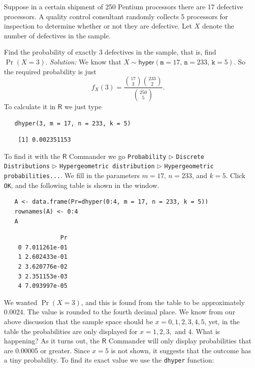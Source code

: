 \documentclass[captions=tableheading]{scrbook}
\begin{document}
\begin{example}
Suppose in a certain shipment of 250 Pentium processors there are 17 defective processors. A quality control consultant randomly collects 5 processors for inspection to determine whether or not they are defective. Let \(X\) denote the number of defectives in the sample.

Find the probability of exactly 3 defectives in the sample, that is, find \(\Pr(X=3)\). 
   \emph{Solution:} We know that \(X\sim\mathsf{hyper}(\mathtt{m}=17,\,\mathtt{n}=233,\,\mathtt{k}=5)\). So the required probability is just
   \[
   f_{X}(3)=\frac{{17 \choose 3}{233 \choose 2}}{{250 \choose 5}}.
   \]
   To calculate it in \(\mathsf{R}\) we just type 


\begin{verbatim}
   dhyper(3, m = 17, n = 233, k = 5)
\end{verbatim}

\begin{verbatim}
    [1] 0.002351153
\end{verbatim}

   To find it with the \(\mathsf{R}\) Commander we go \texttt{Probability} \(\triangleright\) \texttt{Discrete Distributions} \(\triangleright\) \texttt{Hypergeometric distribution} \(\triangleright\) \texttt{Hypergeometric probabilities...}. We fill in the parameters \(m=17\), \(n=233\), and \(k=5\). Click \texttt{OK}, and the following table is shown in the window.


\begin{verbatim}
   A <- data.frame(Pr=dhyper(0:4, m = 17, n = 233, k = 5))
   rownames(A) <- 0:4 
   A
\end{verbatim}

\begin{verbatim}
                Pr
    0 7.011261e-01
    1 2.602433e-01
    2 3.620776e-02
    3 2.351153e-03
    4 7.093997e-05
\end{verbatim}

   We wanted \(\Pr(X=3)\), and this is found from the table to be approximately 0.0024. The value is rounded to the fourth decimal place.
   We know from our above discussion that the sample space should be \(x=0,1,2,3,4,5\), yet, in the table the probabilities are only displayed for \(x = 1,2,3,\) and 4. What is happening? As it turns out, the \(\mathsf{R}\) Commander will only display probabilities that are 0.00005 or greater. Since \(x=5\) is not shown, it suggests that the outcome has a tiny probability. To find its exact value we use the \texttt{dhyper} function:


\end{example}
\end{document}
